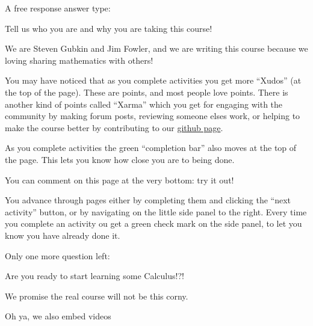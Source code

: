 \documentclass{ximera}
\begin{document}
A free response answer type:

Tell us who you are and why you are taking this course!
\begin{free-response}
	We are Steven Gubkin and Jim Fowler, and we are writing this course because we loving sharing mathematics with others!
\end{free-response}

You may have noticed that as you complete activities you get more ``Xudos'' (at the top of the page).  These are points, and most people love points.
There is another kind of points called ``Xarma'' which you get for engaging with the community by making forum posts, reviewing someone elses work, or 
helping to make the course better by contributing to our \href{https://github.com/kisonecat/m2o2c2}{github page}.

As you complete activities the green ``completion bar''  also moves at the top of the page.  This lets you know how close you are to being done.

You can comment on this page at the very bottom:  try it out!

You advance through pages either by completing them and clicking the ``next activity'' button, or by navigating on the little side panel to the right. 
 Every time you complete an activity ou get a green check mark on the side panel, to let you know you have already done it.
 
Only one more question left:
\begin{question}
	\begin{solution}
		Are you ready to start learning some Calculus!?!
		\begin{multiple-choice}
			\begin{hint}
				We promise the real course will not be this corny.
			\end{hint}
		\end{multiple-choice}
	\end{solution}
\end{question}

Oh ya, we also embed videos
\end{document}
